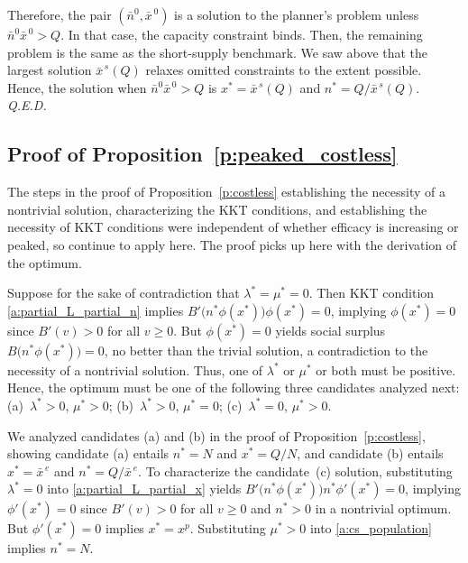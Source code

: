 \documentclass[12pt]{article}
\renewcommand{\qed}{{\it Q.E.D.}}
\newcommand{\efficacy}{\phi}
\newcommand{\benefit}{B}
\newcommand{\xshortbar}{\bar{x}^{\,s}}
\newcommand{\xunitbar}{\bar{x}^{\,e}}
\newcommand{\xpeak}{x^{p}}
\newcommand{\xnobar}{\bar{x}^{\,0}}
\newcommand{\nnobar}{\bar{n}^{0}}
\begin{document}
Therefore, the pair $(\nnobar, \xnobar)$ is a solution to the
planner's problem unless $\nnobar \xnobar > Q$. In that case, the
capacity constraint binds. Then, the remaining problem is the same as
the short-supply benchmark. We saw above that the largest solution
$\xshortbar\!(Q)$ relaxes omitted constraints to the extent
possible. Hence, the solution when $\nnobar \xnobar > Q$ is $x^* =
\xshortbar\!(Q)$ and $n^* = Q / \xshortbar\!(Q)$. \qed


\subsection*{Proof of Proposition~\ref{p:peaked_costless}}

The steps in the proof of Proposition~\ref{p:costless} establishing
the necessity of a nontrivial solution, characterizing the KKT
conditions, and establishing the necessity of KKT conditions were
independent of whether efficacy is increasing or peaked, so continue
to apply here. The proof picks up here with the derivation of the
optimum.

Suppose for the sake of contradiction that $\lambda^* = \mu^* =
0$. Then KKT condition \eqref{a:partial_L_partial_n} implies
$\benefit' \! \bigl( n^* \efficacy(x^*) \bigr) \efficacy(x^*) = 0$,
implying $\efficacy(x^*) = 0$ since $\benefit'(v) > 0$ for all $v \geq
0$. But $\efficacy(x^*) = 0$ yields social surplus $\benefit \bigl(n^*
\efficacy(x^*) \bigr) = 0$, no better than the trivial solution, a
contradiction to the necessity of a nontrivial solution. Thus, one of
$\lambda^*$ or $\mu^*$ or both must be positive. Hence, the optimum
must be one of the following three candidates analyzed next:
(a)~$\lambda^* > 0$, $\mu^* > 0$; (b)~$\lambda^* > 0$, $\mu^* = 0$;
(c)~$\lambda^*=0$, $\mu^* > 0$.

We analyzed candidates (a) and (b) in the proof of
Proposition~\ref{p:costless}, showing candidate (a) entails $n^* = N$
and $x^* = Q/N$, and candidate (b) entails $x^* = \xunitbar$ and $n^* = Q
/ \xunitbar$.  To characterize the candidate~(c) solution, substituting
$\lambda^* = 0$ into \eqref{a:partial_L_partial_x} yields $\benefit'
\! \bigl( n^* \efficacy(x^*) \bigr) n^* \efficacy'(x^*) = 0$, implying
$\efficacy'(x^*) = 0$ since $\benefit'(v) > 0$ for all $v \geq 0$ and
$n^* >0$ in a nontrivial optimum. But $\efficacy'(x^*) = 0$ implies
$x^* = \xpeak$. Substituting $\mu ^* > 0$ into \eqref{a:cs_population}
implies $n^* = N$.
\end{document}
